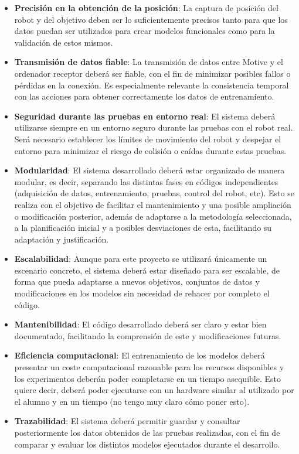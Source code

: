 \begin{itemize}
    \item \textbf{Precisión en la obtención de la posición}:
    La captura de posición del robot y del objetivo deben ser lo suficientemente precisos tanto para que los datos puedan ser utilizados para crear modelos 
    funcionales como para la validación de estos mismos.

    \item \textbf{Transmisión de datos fiable}:
    La transmisión de datos entre Motive y el ordenador receptor deberá ser fiable, con el fin de minimizar posibles fallos o pérdidas en la conexión. 
    Es especialmente relevante la consistencia temporal con las acciones para obtener correctamente los datos de entrenamiento.

    \item \textbf{Seguridad durante las pruebas en entorno real}: 
    El sistema deberá utilizarse siempre en un entorno seguro durante las pruebas con el robot real. Será necesario establecer los límites de movimiento del 
    robot y despejar el entorno para minimizar el riesgo de colisión o caídas durante estas pruebas.

    \item \textbf{Modularidad}:
    El sistema desarrollado deberá estar organizado de manera modular, es decir, separando las distintas fases en códigos independientes (adquisición de 
    datos, entrenamiento, pruebas, control del robot, etc). Esto se realiza con el objetivo de facilitar el mantenimiento y una posible ampliación o modificación 
    posterior, además de adaptarse a la metodología seleccionada, a la planificación inicial y a posibles desviaciones de esta, facilitando su adaptación 
    y justificación.

    \item \textbf{Escalabilidad}:
    Aunque para este proyecto se utilizará únicamente un escenario concreto, el sistema deberá estar diseñado para ser escalable, de forma que pueda 
    adaptarse a nuevos objetivos, conjuntos de datos y modificaciones en los modelos sin necesidad de rehacer por completo el código.

    \item \textbf{Mantenibilidad}:
    El código desarrollado deberá ser claro y estar bien documentado, facilitando la comprensión de este y modificaciones futuras.

    \item \textbf{Eficiencia computacional}:
    El entrenamiento de los modelos deberá presentar un coste computacional razonable para los recursos disponibles y los experimentos deberán poder completarse en 
    un tiempo asequible. Esto quiere decir, deberá poder ejecutarse con un hardware similar al utilizado por el alumno y en un 
    tiempo (no tengo muy claro cómo poner esto).

    \item \textbf{Trazabilidad}:  
    El sistema deberá permitir guardar y consultar posteriormente los datos obtenidos de las pruebas realizadas, con el fin de comparar y evaluar los 
    distintos modelos ejecutados durante el desarrollo.
    
\end{itemize}